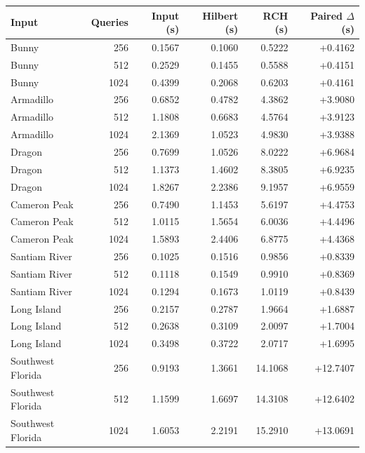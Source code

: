 \begin{tabular}{lrrrrr}
Input & Queries & Input (s) & Hilbert (s) & RCH (s) & Paired $\Delta$ (s) \\
\hline
Bunny & 256 & 0.1567 & 0.1060 & 0.5222 & +0.4162 \\
Bunny & 512 & 0.2529 & 0.1455 & 0.5588 & +0.4151 \\
Bunny & 1024 & 0.4399 & 0.2068 & 0.6203 & +0.4161 \\
Armadillo & 256 & 0.6852 & 0.4782 & 4.3862 & +3.9080 \\
Armadillo & 512 & 1.1808 & 0.6683 & 4.5764 & +3.9123 \\
Armadillo & 1024 & 2.1369 & 1.0523 & 4.9830 & +3.9388 \\
Dragon & 256 & 0.7699 & 1.0526 & 8.0222 & +6.9684 \\
Dragon & 512 & 1.1373 & 1.4602 & 8.3805 & +6.9235 \\
Dragon & 1024 & 1.8267 & 2.2386 & 9.1957 & +6.9559 \\
Cameron Peak & 256 & 0.7490 & 1.1453 & 5.6197 & +4.4753 \\
Cameron Peak & 512 & 1.0115 & 1.5654 & 6.0036 & +4.4496 \\
Cameron Peak & 1024 & 1.5893 & 2.4406 & 6.8775 & +4.4368 \\
Santiam River & 256 & 0.1025 & 0.1516 & 0.9856 & +0.8339 \\
Santiam River & 512 & 0.1118 & 0.1549 & 0.9910 & +0.8369 \\
Santiam River & 1024 & 0.1294 & 0.1673 & 1.0119 & +0.8439 \\
Long Island & 256 & 0.2157 & 0.2787 & 1.9664 & +1.6887 \\
Long Island & 512 & 0.2638 & 0.3109 & 2.0097 & +1.7004 \\
Long Island & 1024 & 0.3498 & 0.3722 & 2.0717 & +1.6995 \\
Southwest Florida & 256 & 0.9193 & 1.3661 & 14.1068 & +12.7407 \\
Southwest Florida & 512 & 1.1599 & 1.6697 & 14.3108 & +12.6402 \\
Southwest Florida & 1024 & 1.6053 & 2.2191 & 15.2910 & +13.0691 \\
\end{tabular}
